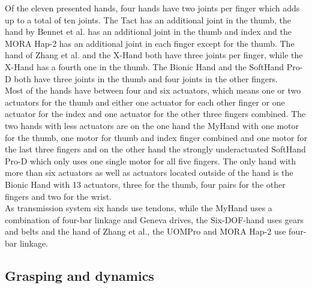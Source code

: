 \documentclass[a4paper, 10pt, conference]{ieeeconf}      %
\begin{document}
Of the eleven presented hands, four hands have two joints per finger which adds up to a total of ten joints. The Tact has an additional joint in the thumb, the hand by Bennet et al. has an additional joint in the thumb and index and the MORA Hap-2 has an additional joint in each finger except for the thumb. The hand of Zhang et al. and the X-Hand both have three joints per finger, while the X-Hand has a fourth one in the thumb. The Bionic Hand and the SoftHand Pro-D both have three joints in the thumb and four joints in the other fingers.\\
Most of the hands have between four and six actuators, which means one or two actuators for the thumb and either one actuator for each other finger or one actuator for the index and one actuator for the other three fingers combined. The two hands with less actuators are on the one hand the MyHand with one motor for the thumb, one motor for thumb and index finger combined and one motor for the last three fingers and on the other hand the strongly underactuated SoftHand Pro-D which only uses one single motor for all five fingers. The only hand with more than six actuators as well as actuators located outside of the hand is the Bionic Hand with 13 actuators, three for the thumb, four pairs for the other fingers and two for the wrist.\\
As transmission system six hands use tendons, while the MyHand uses a combination of four-bar linkage and Geneva drives, the Six-DOF-hand uses gears and belts and the hand of Zhang et al., the UOMPro and MORA Hap-2 use four-bar linkage.

\subsection{Grasping and dynamics}
\end{document}
